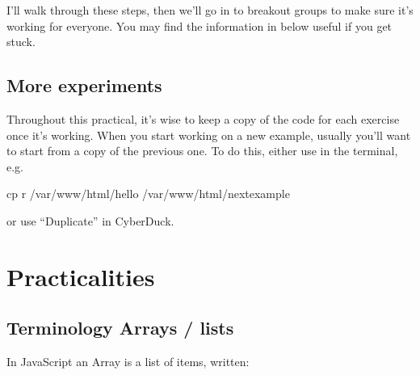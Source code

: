 \documentclass[letterpaper,10pt,english]{sphinxmanual}
\begin{document}
\begin{sphinxShadowBox}

I’ll walk through these steps, then we’ll go in to breakout groups to make sure
it’s working for everyone. You may find the information in {\hyperref[\detokenize{jspsych_au:practicalities}]{}}
below useful if you get stuck.
\end{sphinxShadowBox}


\subsection{More experiments}
\label{\detokenize{jspsych_au:more-experiments}}
Throughout this practical, it’s wise to keep a copy of the code for each
exercise once it’s working. When you start working on a new example, usually
you’ll want to start from
a copy of the previous one. To do this, either use  in the terminal, e.g.

\begin{sphinxVerbatim}[commandchars=\\\{\}]
cp \PYGZhy{}r /var/www/html/hello /var/www/html/next\PYGZus{}example
\end{sphinxVerbatim}

or use “Duplicate” in CyberDuck.


\section{Practicalities}
\label{\detokenize{jspsych_au:practicalities}}

\subsection{Terminology \textendash{} Arrays / lists}
\label{\detokenize{jspsych_au:terminology-arrays-lists}}
In JavaScript an Array is a list of items, written:

\begin{sphinxVerbatim}[commandchars=\\\{\}]
   \PYG{p}{[}    \PYG{p}{]}
\end{sphinxVerbatim}
\end{document}
